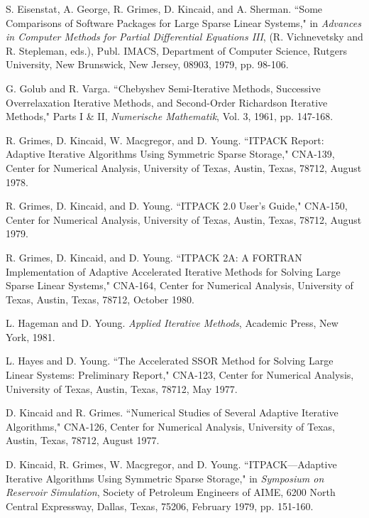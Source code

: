 \newpage
\begin{thebibliography}{99}
 
 S. Eisenstat, A. George, R. Grimes, D. Kincaid, and
 A. Sherman. ``Some Comparisons of Software Packages for Large
 Sparse Linear Systems," in {\em Advances in Computer Methods for
 Partial Differential Equations III}, (R. Vichnevetsky and
 R. Stepleman, eds.), Publ. IMACS, Department of Computer Science,
 Rutgers University, New Brunswick, New Jersey, 08903, 1979, 
 pp. 98-106.

 G. Golub and R. Varga. ``Chebyshev Semi-Iterative Methods,
 Successive Overrelaxation Iterative Methods, and Second-Order
 Richardson Iterative Methods," Parts I \& II, {\em Numerische 
 Mathematik}, Vol. 3, 1961, pp. 147-168.
 
 R. Grimes, D. Kincaid, W. Macgregor, and D. Young.
 ``ITPACK Report: Adaptive Iterative Algorithms Using Symmetric 
 Sparse Storage," CNA-139, Center for Numerical Analysis, University of 
 Texas, Austin, Texas, 78712, August 1978.
 
 R. Grimes, D. Kincaid, and D. Young. ``ITPACK 2.0 User's
 Guide," CNA-150, Center for Numerical Analysis, University of
 Texas, Austin, Texas, 78712, August 1979.
 
 R. Grimes, D. Kincaid, and D. Young. ``ITPACK 2A: A
 FORTRAN Implementation of Adaptive Accelerated Iterative
 Methods for Solving Large Sparse Linear Systems," CNA-164,
 Center for Numerical Analysis, University of Texas, Austin,
 Texas, 78712, October 1980.
 
 L. Hageman and D. Young. {\em Applied Iterative Methods},
 Academic Press, New York, 1981.
 
 L. Hayes and D. Young. ``The Accelerated SSOR Method for
 Solving Large Linear Systems: Preliminary Report," CNA-123,
 Center for Numerical Analysis, University of Texas, Austin, Texas,
 78712, May 1977.
 
 D. Kincaid and R. Grimes. ``Numerical Studies of Several
 Adaptive Iterative Algorithms," CNA-126, Center for Numerical
 Analysis, University of Texas, Austin, Texas, 78712, August 1977.
 
 D. Kincaid, R. Grimes, W. Macgregor, and D. Young.
 ``ITPACK---Adaptive Iterative Algorithms Using Symmetric
 Sparse Storage," in {\em Symposium on Reservoir Simulation}, Society
 of Petroleum Engineers of AIME, 6200 North Central Expressway, Dallas,
 Texas, 75206, February 1979, pp. 151-160.
 

\end{thebibliography}
